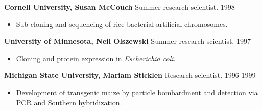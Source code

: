 \documentclass[10pt]{article}
\begin{document}
\textbf{Cornell University, Susan McCouch} Summer research scientist. 1998
\begin{itemize}
  \item[] Sub-cloning and sequencing of rice bacterial artificial chromosomes.
\end{itemize}

\textbf{University of Minnesota, Neil Olszewski} Summer research scientist. 1997
\begin{itemize}
  \item[] Cloning and protein expression in \textit{Escherichia coli}.
\end{itemize}

\textbf{Michigan State University, Mariam Sticklen} Research scientist. 1996-1999
\begin{itemize}
  \item[] Development of transgenic maize by particle bombardment and
  detection via PCR and Southern hybridization.
\end{itemize}
\end{document}
